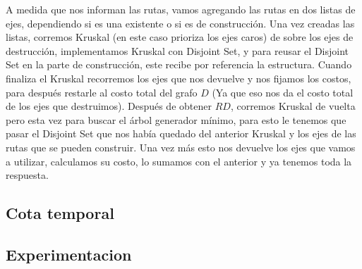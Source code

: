 A medida que nos informan las rutas, vamos agregando las rutas en dos listas de ejes, dependiendo si es una existente o si es de construcción. Una vez creadas las listas, corremos Kruskal (en este caso prioriza los ejes caros) de sobre los ejes de destrucción, implementamos Kruskal con Disjoint Set, y para reusar el Disjoint Set en la parte de construcción, este recibe por referencia la estructura. Cuando finaliza el Kruskal recorremos los ejes que nos devuelve y nos fijamos los costos, para después restarle al costo total del grafo $D$ (Ya que eso nos da el costo total de los ejes que destruimos). Después de obtener $RD$, corremos Kruskal de vuelta pero esta vez para buscar el árbol generador mínimo, para esto le tenemos que pasar el Disjoint Set que nos había quedado del anterior Kruskal  y los ejes de las rutas que se pueden construir. Una vez más esto nos devuelve los ejes que vamos a utilizar, calculamos su costo, lo sumamos con el anterior y ya tenemos toda la respuesta.

\subsection{Cota temporal}

\subsection{Experimentacion}

\pagebreak
